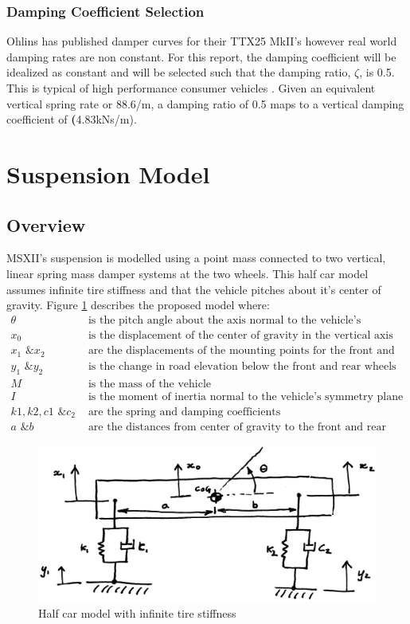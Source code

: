 \documentclass[12pt]{article}
\begin{document}
\subsubsection{Damping Coefficient Selection}
Ohlins has published damper curves for their TTX25 MkII's however real world damping rates are non constant. For this report, the damping coefficient will be idealized as constant and will be selected such that the damping ratio, $\zeta$, is 0.5. This is typical of high performance consumer vehicles \cite{dampers}. Given an equivalent vertical spring rate or 88.6/m, a damping ratio of 0.5 maps to a vertical damping coefficient of \textbf(4.83kNs/m). 

\section{Suspension Model}
\subsection{Overview}
MSXII's suspension is modelled using a point mass connected to two vertical, linear spring mass damper systems at the two wheels. This half car model assumes infinite tire stiffness and that the vehicle pitches about it's center of gravity. Figure \ref{fig:systemModel} describes the proposed model where: 
\begin{align*}
	\theta & \text{ is the pitch angle about the axis normal to the vehicle's symmetry plane}\\        
	x_0 & \text{ is the displacement of the center of gravity in the vertical axis} \\
	x_1 \text{ \& } x_2 & \text{ are the displacements of the mounting points for the front and rear wheels respectively} \\
	y_1 \text{ \& } y_2 & \text{ is the change in road elevation below the front  and rear wheels respectively} \\
	M & \text{ is the mass of the vehicle} \\
	I & \text{ is the moment of inertia normal to the vehicle’s symmetry plane at the center of gravity} \\
	k1,k2,c1 \text{ \& } c_2 & \text{ are the spring and damping coefficients} \\
	a \text{ \& } b & \text{ are the distances from center of gravity to the front and rear wheels respectively}
\end{align*}
\begin{figure}[h!]
	\centering
	\includegraphics[width=.8\textwidth]{./LaTex/systemModel.jpg}
	\caption{Half car model with infinite tire stiffness}
	\label{fig:systemModel}
\end{figure}
\end{document}
